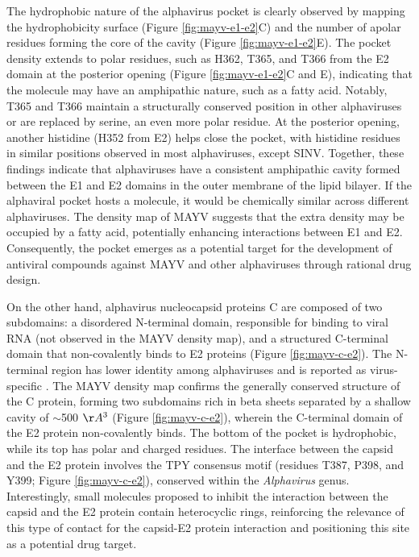 \documentclass[Ingles]{phdthesis}
\begin{document}
The hydrophobic nature of the alphavirus pocket is clearly observed by mapping the hydrophobicity surface (Figure \ref{fig:mayv-e1-e2}C) and the number of apolar residues forming the core of the cavity (Figure \ref{fig:mayv-e1-e2}E). The pocket density extends to polar residues, such as H362, T365, and T366 from the E2 domain at the posterior opening (Figure \ref{fig:mayv-e1-e2}C and E), indicating that the molecule may have an amphipathic nature, such as a fatty acid. Notably, T365 and T366 maintain a structurally conserved position in other alphaviruses or are replaced by serine, an even more polar residue. At the posterior opening, another histidine (H352 from E2) helps close the pocket, with histidine residues in similar positions observed in most alphaviruses, except SINV. Together, these findings indicate that alphaviruses have a consistent amphipathic cavity formed between the E1 and E2 domains in the outer membrane of the lipid bilayer. If the alphaviral pocket hosts a molecule, it would be chemically similar across different alphaviruses. The density map of \acs{MAYV} suggests that the extra density may be occupied by a fatty acid, potentially enhancing interactions between E1 and E2. Consequently, the pocket emerges as a potential target for the development of antiviral compounds against \acs{MAYV} and other alphaviruses through rational drug design.

On the other hand, alphavirus nucleocapsid proteins C are composed of two subdomains: a disordered N-terminal domain, responsible for binding to viral RNA (not observed in the \acs{MAYV} density map), and a structured C-terminal domain that non-covalently binds to E2 proteins (Figure \ref{fig:mayv-c-e2}). The N-terminal region has lower identity among alphaviruses and is reported as virus-specific \cite{ribeiro2021}. The \acs{MAYV} density map confirms the generally conserved structure of the C protein, forming two subdomains rich in beta sheets separated by a shallow cavity of $\sim$500 $\AA^3$ (Figure \ref{fig:mayv-c-e2}), wherein the C-terminal domain of the E2 protein non-covalently binds. The bottom of the pocket is hydrophobic, while its top has polar and charged residues. The interface between the capsid and the E2 protein involves the TPY consensus motif (residues T387, P398, and Y399; Figure \ref{fig:mayv-c-e2}), conserved within the \textit{Alphavirus} genus. Interestingly, small molecules proposed to inhibit the interaction between the capsid and the E2 protein contain heterocyclic rings, reinforcing the relevance of this type of contact for the capsid-E2 protein interaction and positioning this site as a potential drug target.
\end{document}
